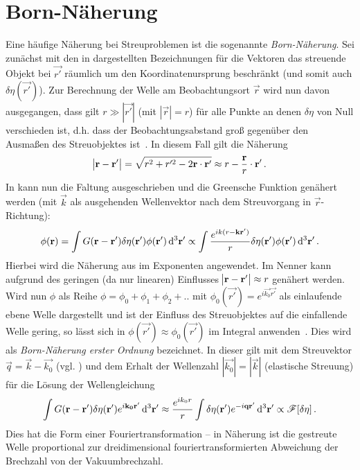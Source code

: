 \section{Born-Näherung}
Eine häufige Näherung bei Streuproblemen ist die sogenannte \textit{Born-Näherung}. Sei zunächst mit den in   dargestellten Bezeichnungen für die Vektoren das streuende Objekt bei $\vec{r'}$ räumlich um den Koordinatenursprung beschränkt (und somit auch $\delta\eta(\vec{r'})$). Zur Berechnung der Welle am Beobachtungsort $\vec{r}$ wird nun davon ausgegangen, dass gilt $r\gg |\vec{r'}|$ (mit $|\vec{r}| =r$) für alle Punkte an denen $\delta\eta$ von Null verschieden ist, d.h. dass der Beobachtungsabstand groß gegenüber den Ausmaßen des Streuobjektes ist~\cite{griffiths2005}. In diesem Fall gilt die Näherung
\begin{equation}
	\abs{\mathbf{r}-\mathbf{r'}} = \sqrt{r^2+r'^2-2\mathbf{r}\cdot\mathbf{r'}} \approx r-\frac{\mathbf{r}}{r}\cdot\mathbf{r'} \,.
	\label{eq:born_r_approx}
\end{equation}
In  kann nun die Faltung ausgeschrieben und die Greensche Funktion genähert werden (mit $\vec{k}$ als ausgehenden Wellenvektor nach dem Streuvorgang in $\vec{r}$-Richtung):
\begin{equation}
	\phi(\mathbf{r})=\int G(\mathbf{r}-\mathbf{r'})\delta\eta(\mathbf{r'})\phi(\mathbf{r}') \operatorname{d^3 \!} \mathbf{r'} 
	\propto \int \frac{e^{ik(r-\mathbf{k}\mathbf{r'})}}{r}\delta\eta(\mathbf{r}')\phi(\mathbf{r}') \operatorname{d^3 \!} \mathbf{r'} \,.
	\label{eq:born_ort}
\end{equation}
Hierbei wird die Näherung aus  im Exponenten angewendet. Im Nenner kann aufgrund des geringen (da nur linearen) Einflusses $\abs{\mathbf{r}-\mathbf{r'}}\approx r$ genähert werden. Wird nun $\phi$ als Reihe $\phi=\phi_0+\phi_1+\phi_2+..$ mit $\phi_0(\vec{r'})=e^{i\vec{k_0}\vec{r'}}$ als einlaufende ebene Welle dargestellt und ist der Einfluss des Streuobjektes auf die einfallende Welle gering, so lässt sich in  $\phi(\vec{r'})\approx\phi_0(\vec{r'})$ im Integral anwenden~\cite{cowley1995}. Dies wird als \textit{Born-Näherung erster Ordnung} bezeichnet. In dieser gilt mit dem Streuvektor $\vec{q}=\vec{k}-\vec{k_0}$ (vgl. ) und dem Erhalt der Wellenzahl $|\vec{k_0}|=|\vec{k}|$ (elastische Streuung) für die Lösung der Wellengleichung
\begin{equation}
	\label{eq:born}
	\int G(\mathbf{r}-\mathbf{r}')\delta\eta(\mathbf{r}') e^{i\mathbf{k_0}\mathbf{r'}}  \operatorname{d^3 \!} \mathbf{r}'
	\approx \frac{e^{ik_0r}}{r}\int \delta\eta(\mathbf{r}')e^{-i\mathbf{q}\mathbf{r}'}\operatorname{d^3 \!} \mathbf{r}'\propto \mathscr{F}[\delta\eta] \,.
\end{equation} 
Dies hat die Form einer Fouriertransformation -- in Näherung ist die gestreute Welle proportional zur dreidimensional fouriertransformierten Abweichung der Brechzahl von der Vakuumbrechzahl.


